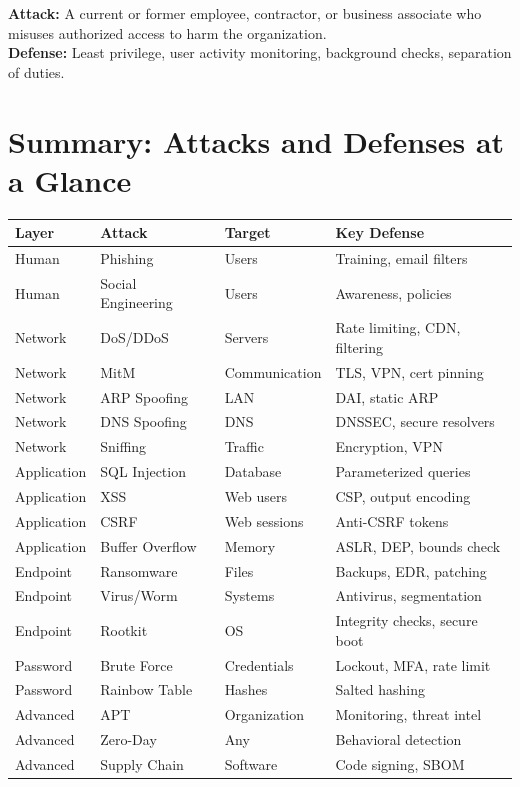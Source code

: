\documentclass[11pt,a4paper]{article}
\begin{document}
\begin{alertbox}
\textbf{Attack:} A current or former employee, contractor, or business associate who misuses authorized access to harm the organization.\\
\textbf{Defense:} Least privilege, user activity monitoring, background checks, separation of duties.
\end{alertbox}

\section{Summary: Attacks and Defenses at a Glance}

\begin{center}
\small
{}
\begin{longtable}{@{}p{2.8cm}p{3.5cm}p{2.5cm}p{4.5cm}@{}}
\toprule
\rowcolor{primary!15}
\textbf{Layer} & \textbf{Attack} & \textbf{Target} & \textbf{Key Defense} \\
\midrule
\endhead
Human & Phishing & Users & Training, email filters \\
Human & Social Engineering & Users & Awareness, policies \\
\addlinespace
Network & DoS/DDoS & Servers & Rate limiting, CDN, filtering \\
Network & MitM & Communication & TLS, VPN, cert pinning \\
Network & ARP Spoofing & LAN & DAI, static ARP \\
Network & DNS Spoofing & DNS & DNSSEC, secure resolvers \\
Network & Sniffing & Traffic & Encryption, VPN \\
\addlinespace
Application & SQL Injection & Database & Parameterized queries \\
Application & XSS & Web users & CSP, output encoding \\
Application & CSRF & Web sessions & Anti-CSRF tokens \\
Application & Buffer Overflow & Memory & ASLR, DEP, bounds check \\
\addlinespace
Endpoint & Ransomware & Files & Backups, EDR, patching \\
Endpoint & Virus/Worm & Systems & Antivirus, segmentation \\
Endpoint & Rootkit & OS & Integrity checks, secure boot \\
\addlinespace
Password & Brute Force & Credentials & Lockout, MFA, rate limit \\
Password & Rainbow Table & Hashes & Salted hashing \\
\addlinespace
Advanced & APT & Organization & Monitoring, threat intel \\
Advanced & Zero-Day & Any & Behavioral detection \\
Advanced & Supply Chain & Software & Code signing, SBOM \\
\bottomrule
\end{longtable}
\end{center}
\end{document}
